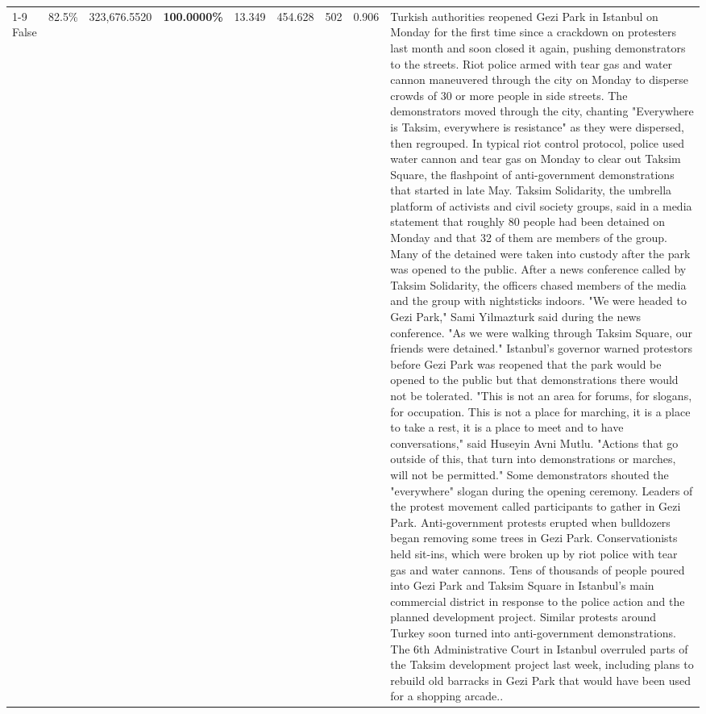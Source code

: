 \begin{table}[H]
\begin{tabular}{lllrlllll}
\cline{1-9}
False & 82.5\% & 323,676.5520 & \bfseries \color{red} 100.0000\% & 13.349 & 454.628 & 502 & 0.906 & Turkish authorities reopened Gezi Park in Istanbul on Monday for the first time since a crackdown on protesters last month and soon closed it again, pushing demonstrators to the streets. Riot police armed with tear gas and water cannon maneuvered through the city on Monday to disperse crowds of 30 or more people in side streets. The demonstrators moved through the city, chanting "Everywhere is Taksim, everywhere is resistance" as they were dispersed, then regrouped. In typical riot control protocol, police used water cannon and tear gas on Monday to clear out Taksim Square, the flashpoint of anti-government demonstrations that started in late May. Taksim Solidarity, the umbrella platform of activists and civil society groups, said in a media statement that roughly 80 people had been detained on Monday and that 32 of them are members of the group. Many of the detained were taken into custody after the park was opened to the public. After a news conference called by Taksim Solidarity, the officers chased members of the media and the group with nightsticks indoors. "We were headed to Gezi Park," Sami Yilmazturk said during the news conference. "As we were walking through Taksim Square, our friends were detained." Istanbul's governor warned protestors before Gezi Park was reopened that the park would be opened to the public but that demonstrations there would not be tolerated. "This is not an area for forums, for slogans, for occupation. This is not a place for marching, it is a place to take a rest, it is a place to meet and to have conversations," said Huseyin Avni Mutlu. "Actions that go outside of this, that turn into demonstrations or marches, will not be permitted." Some demonstrators shouted the "everywhere" slogan during the opening ceremony. Leaders of the protest movement called participants to gather in Gezi Park. Anti-government protests erupted when bulldozers began removing some trees in Gezi Park. Conservationists held sit-ins, which were broken up by riot police with tear gas and water cannons. Tens of thousands of people poured into Gezi Park and Taksim Square in Istanbul's main commercial district in response to the police action and the planned development project. Similar protests around Turkey soon turned into anti-government demonstrations. The 6th Administrative Court in Istanbul overruled parts of the Taksim development project last week, including plans to rebuild old barracks in Gezi Park that would have been used for a shopping arcade.. \\

\end{tabular}
\end{table}
